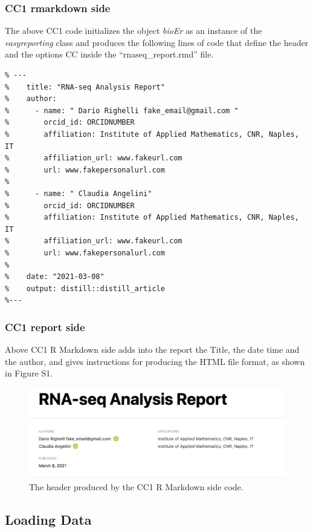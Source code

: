 \documentclass[
]{article}
\begin{document}
\hypertarget{cc1-rmarkdown-side}{%
\subsubsection{CC1 rmarkdown side}\label{cc1-rmarkdown-side}}

The above CC1 code initializes the object \emph{bioEr} as an instance of
the \emph{easyreporting} class and produces the following lines of code
that define the header and the options CC inside the
``rnaseq\_report.rmd'' file.

\begin{verbatim}
% ---
%    title: "RNA-seq Analysis Report"
%    author: 
%      - name: " Dario Righelli fake_email@gmail.com "
%        orcid_id: ORCIDNUMBER
%        affiliation: Institute of Applied Mathematics, CNR, Naples, IT
%        affiliation_url: www.fakeurl.com
%        url: www.fakepersonalurl.com
%
%      - name: " Claudia Angelini"
%        orcid_id: ORCIDNUMBER
%        affiliation: Institute of Applied Mathematics, CNR, Naples, IT
%        affiliation_url: www.fakeurl.com
%        url: www.fakepersonalurl.com
%
%    date: "2021-03-08"
%    output: distill::distill_article
%---
\end{verbatim}

\hypertarget{cc1-report-side}{%
\subsubsection{CC1 report side}\label{cc1-report-side}}

Above CC1 R Markdown side adds into the report the Title, the date time
and the author, and gives instructions for producing the HTML file
format, as shown in Figure S1.

\begin{figure}
\centering
\includegraphics{imgs/1.png}
\caption{The header produced by the CC1 R Markdown side code.}
\end{figure}

\hypertarget{loading-data}{%
\subsection{Loading Data}\label{loading-data}}
\end{document}
